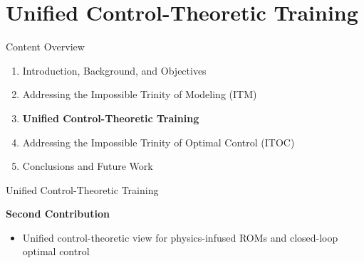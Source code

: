 \section{Unified Control-Theoretic Training}

\begin{frame}{Content Overview}
    \footnotesize
    \begin{enumerate}
        \item \textcolor{gray!50}{Introduction, Background, and Objectives}
        \item \textcolor{gray!50}{Addressing the Impossible Trinity of Modeling (ITM)}
        \item \colorbox{yellow!70}{\textbf{Unified Control-Theoretic Training}}
        \item \textcolor{gray!50}{Addressing the Impossible Trinity of Optimal Control (ITOC)}
        \item \textcolor{gray!50}{Conclusions and Future Work}
    \end{enumerate}
\end{frame}

\begin{frame}{Unified Control-Theoretic Training}
    
    {\huge\textbf{Second Contribution}}
    {\footnotesize
    \begin{itemize}
        \item Unified control-theoretic view for physics-infused ROMs and closed-loop optimal control
    \end{itemize}}

\end{frame}

